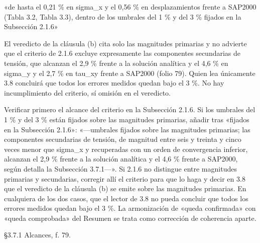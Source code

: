 \begin{dice}«de hasta el 0,21 \% en sigma\_\allowbreak{}x y el 0,56 \% en desplazamientos frente a SAP2000 (Tabla 3.2, Tabla 3.3), dentro de los umbrales del 1 \% y del 3 \% fijados en la Subsección 2.1.6»\end{dice}
{\small{}El veredicto de la cláusula (b) cita solo las magnitudes primarias y no advierte que el criterio de 2.1.6 excluye expresamente las componentes secundarias de tensión, que alcanzan el 2,9 \% frente a la solución analítica y el 4,6 \% en sigma\_\allowbreak{}y y el 2,7 \% en tau\_\allowbreak{}xy frente a SAP2000 (folio 79). Quien lea únicamente 3.8 concluirá que todos los errores medidos quedan bajo el 3 \%. No hay incumplimiento del criterio, sí omisión en el veredicto.\par}
\begin{debedecir}Verificar primero el alcance del criterio en la Subsección 2.1.6. Si los umbrales del 1 \% y del 3 \% están fijados sobre las magnitudes primarias, añadir tras «fijados en la Subsección 2.1.6»: «—umbrales fijados sobre las magnitudes primarias; las componentes secundarias de tensión, de magnitud entre seis y treinta y cinco veces menor que sigma\_\allowbreak{}x y recuperadas con un orden de convergencia inferior, alcanzan el 2,9 \% frente a la solución analítica y el 4,6 \% frente a SAP2000, según detalla la Subsección 3.7.1—». Si 2.1.6 no distingue entre magnitudes primarias y secundarias, corregir allí el criterio para que lo haga y decir en 3.8 que el veredicto de la cláusula (b) se emite sobre las magnitudes primarias. En cualquiera de los dos casos, que el lector de 3.8 no pueda concluir que todos los errores medidos quedan bajo el 3 \%. La armonización de «queda confirmada» con «queda comprobada» del Resumen se trata como corrección de coherencia aparte.\end{debedecir}
{\small{}§3.7.1 Alcances, f. 79.\par}
\vspace{6pt}
